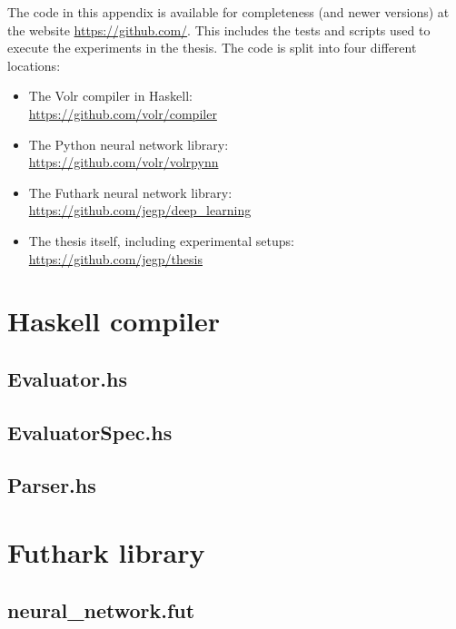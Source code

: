 The code in this appendix is available for completeness (and newer versions) 
at the website \url{https://github.com/}. 
This includes the tests and scripts used to execute the experiments in the
thesis.
The code is split into four different locations:
\begin{itemize}
  \item The Volr compiler in Haskell: \\ \url{https://github.com/volr/compiler}
  \item The Python neural network library: \\ \url{https://github.com/volr/volrpynn}
  \item The Futhark neural network library: \\ \url{https://github.com/jegp/deep_learning}
  \item The thesis itself, including experimental setups: \\ \url{https://github.com/jegp/thesis}
\end{itemize}

\section{Haskell compiler}
\subsection{Evaluator.hs}


\subsection{EvaluatorSpec.hs}


\subsection{Parser.hs} \label{app:implementation_parser}


\section{Futhark library}
\subsection{neural\_network.fut} \label{app:implementation_fut_nn}


